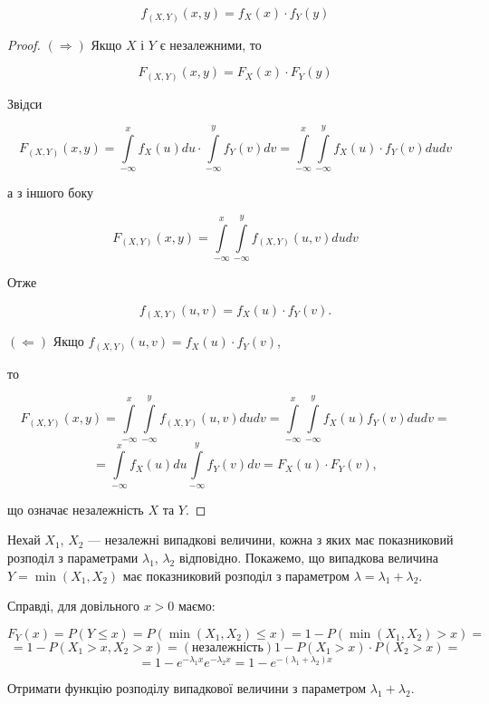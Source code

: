 \begin{equation}
    f_{(X, Y)} (x, y) = f_X(x) \cdot f_Y(y)
\end{equation}
\begin{proof}
    $(\Rightarrow)$ Якщо $X$ і $Y$ є незалежними, то
    
    $$F_{(X, Y)} (x, y) = F_X(x) \cdot F_Y(y)$$
    
    Звідси 
    
    $$F_{(X, Y)} (x, y)
    = \int\limits_{-\infty}^x f_X(u)du \cdot \int\limits_{-\infty}^y f_Y(v) dv
    = \int\limits_{-\infty}^x \int\limits_{-\infty}^y f_X(u) \cdot f_Y(v) du dv
    $$
    
    а з іншого боку
    
    $$F_{(X, Y)} (x, y)
    = \int\limits_{-\infty}^x \int\limits_{-\infty}^y f_{(X, Y)}(u, v) du dv
    $$
    
    Отже 
    
    $$f_{(X, Y)}(u, v) = f_{X}(u) \cdot f_{Y}(v).$$
    
    $(\Leftarrow)$ Якщо $f_{(X, Y)}(u, v) = f_{X}(u) \cdot f_{Y}(v)$,
    
    то 
    
    $$F_{(X, Y)} (x, y)
    = \int\limits_{-\infty}^x \int\limits_{-\infty}^y f_{(X, Y)}(u, v) du dv
    = \int\limits_{-\infty}^x \int\limits_{-\infty}^y f_{X}(u) f_{Y}(v) du dv =$$
    $$= \int\limits_{-\infty}^x f_{X}(u) du \int\limits_{-\infty}^y f_{Y}(v) dv
    = F_{X} (u) \cdot F_{Y} (v),$$
    
    що означає незалежність $X$ та $Y$.
\end{proof}

\begin{example}
    Нехай $X_1$, $X_2$ --- незалежні випадкові величини, кожна з яких
    має показниковий розподіл з параметрами $\lambda_1$, $\lambda_2$ 
    відповідно. Покажемо, що випадкова величина $Y = \min(X_1, X_2)$
    має показниковий розподіл з параметром $\lambda = \lambda_1 + \lambda_2$.
\end{example}

Справді, для довільного $x >0$ маємо:

$$F_Y (x)= 
P(Y \leqslant x)=
P(\min(X_1, X_2) \leqslant x)
= 1 - P(\min(X_1, X_2) > x) =$$
$$= 1 - P(X_1 > x, X_2 > x)
=(\text{незалежність}) 1 - P(X_1 > x) \cdot P(X_2 > x) =$$
$$= 1 - e^{-\lambda_1 x} e^{-\lambda_2 x}
= 1 - e^{-(\lambda_1 + \lambda_2)x}$$

Отримати функцію розподілу випадкової величини з параметром $\lambda_1 + \lambda_2$.

